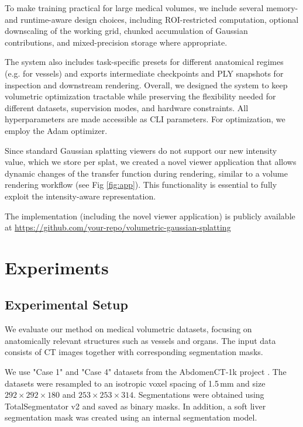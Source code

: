 \documentclass[runningheads]{llncs}
\begin{document}
To make training practical for large medical volumes, we include several memory- and runtime-aware design choices, including ROI-restricted computation, optional downscaling of the working grid, chunked accumulation of Gaussian contributions, and mixed-precision storage where appropriate.

The system also includes task-specific presets for different anatomical regimes (e.g. for vessels) and exports intermediate checkpoints and PLY snapshots for inspection and downstream rendering. Overall, we designed the system to keep volumetric optimization tractable while preserving the flexibility needed for different datasets, supervision modes, and hardware constraints. All hyperparameters are made accessible as CLI parameters. For optimization, we employ the Adam optimizer.

Since standard Gaussian splatting viewers do not support our new intensity value, which we store per splat, we created a novel viewer application that allows dynamic changes of the transfer function during rendering, similar to a volume rendering workflow (see Fig \ref{fig:app}). This functionality is essential to fully exploit the intensity-aware representation.

The implementation (including the novel viewer application) is publicly available at \url{https://github.com/your-repo/volumetric-gaussian-splatting}



\section{Experiments}

\subsection{Experimental Setup}
We evaluate our method on medical volumetric datasets, focusing on anatomically relevant structures such as vessels and organs. The input data consists of CT images together with corresponding segmentation masks.

We use "Case 1" and "Case 4" datasets from the AbdomenCT-1k project \cite{ma2021abdomenct}. The datasets were resampled to an isotropic voxel spacing of 1.5\,mm and size $292 \times 292 \times 180$ and $253 \times 253 \times 314$. Segmentations were obtained using TotalSegmentator v2 and saved as binary masks. In addition, a soft liver segmentation mask was created using an internal segmentation model.
\end{document}
